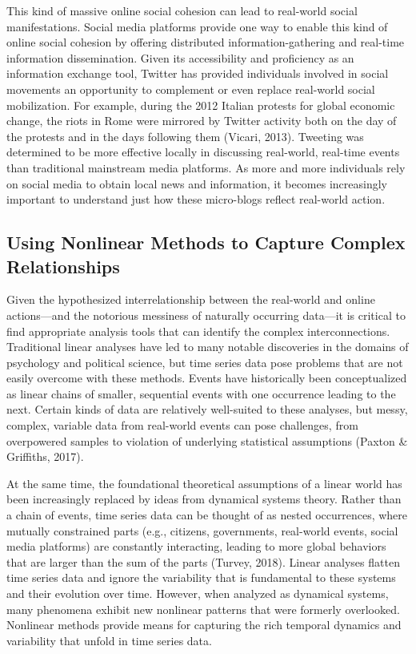 \documentclass[english,man]{apa6}
\begin{document}
This kind of massive online social cohesion can lead to real-world
social manifestations. Social media platforms provide one way to enable this kind of online social
cohesion by offering distributed information-gathering and real-time information
dissemination. Given its accessibility and proficiency as an information
exchange tool, Twitter has provided individuals involved in social movements
an opportunity to complement or even replace real-world social mobilization.
For example, during the 2012 Italian protests for global economic change, the riots in
Rome were mirrored by Twitter activity both on the day of the protests and in the
days following them (Vicari, 2013). Tweeting was
determined to be more effective locally in discussing real-world, real-time
events than traditional mainstream media platforms. As more and more
individuals rely on social media to obtain local news and information, it
becomes increasingly important to understand just how these micro-blogs
reflect real-world action.

\hypertarget{using-nonlinear-methods-to-capture-complex-relationships}{%
\subsection{Using Nonlinear Methods to Capture Complex Relationships}\label{using-nonlinear-methods-to-capture-complex-relationships}}

Given the hypothesized interrelationship between the real-world
and online actions---and the notorious messiness of naturally occurring
data---it is critical to find appropriate analysis tools that can
identify the complex interconnections. Traditional linear analyses have led to
many notable discoveries in the domains of psychology and political science,
but time series data pose problems that are not easily overcome with these
methods. Events have historically been conceptualized as linear chains of
smaller, sequential events with one occurrence leading to the next.
Certain kinds of data are relatively well-suited to these analyses,
but messy, complex, variable data from real-world events can pose
challenges, from overpowered samples to violation of underlying
statistical assumptions (Paxton \& Griffiths, 2017).

At the same time, the foundational theoretical assumptions of a
linear world has been
increasingly replaced by ideas from dynamical systems theory. Rather than
a chain of events, time series data can be thought of as nested occurrences,
where mutually constrained parts (e.g., citizens, governments, real-world
events, social media platforms) are constantly interacting, leading to
more global behaviors that are larger than the sum of the parts
(Turvey, 2018). Linear analyses flatten time series data and ignore
the variability that is fundamental to these systems and their evolution over
time. However, when analyzed as dynamical systems, many phenomena
exhibit new nonlinear patterns that were formerly overlooked.
Nonlinear methods provide means for capturing the rich temporal
dynamics and variability that unfold in time series data.
\end{document}
